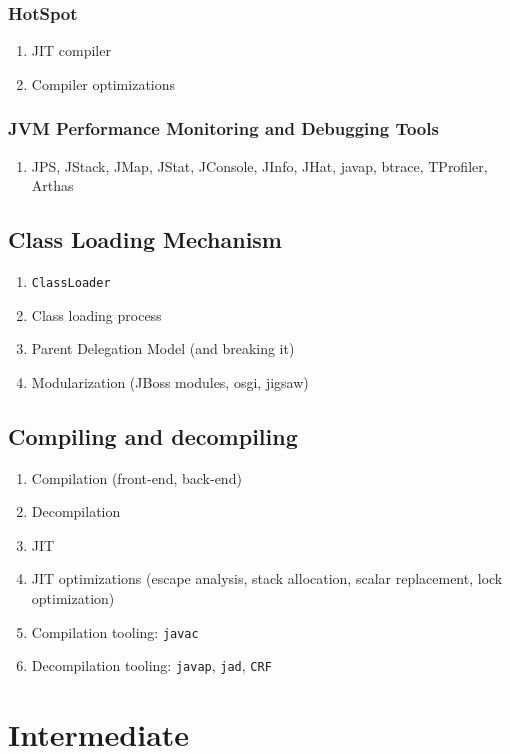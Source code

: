 \documentclass[11pt, twocolumn]{article}
\begin{document}
\subsubsection{HotSpot}
\begin{enumerate}
	\item JIT compiler
	\item Compiler optimizations
\end{enumerate}

\subsubsection{JVM Performance Monitoring and Debugging Tools}
\begin{enumerate}
	\item JPS, JStack, JMap, JStat, JConsole, JInfo, JHat, javap, btrace, TProfiler, Arthas
\end{enumerate}

\subsection{Class Loading Mechanism}
\begin{enumerate}
	\item \texttt{ClassLoader}
	\item Class loading process
	\item Parent Delegation Model (and breaking it)
	\item Modularization (JBoss modules, osgi, jigsaw)
\end{enumerate}

\subsection{Compiling and decompiling}
\begin{enumerate}
	\item Compilation (front-end, back-end)
	\item Decompilation
	\item JIT
	\item JIT optimizations (escape analysis, stack allocation, scalar replacement, lock optimization)
	\item Compilation tooling: \texttt{javac}
	\item Decompilation tooling: \texttt{javap}, \texttt{jad}, \texttt{CRF}
\end{enumerate}

\section{Intermediate}
\end{document}
